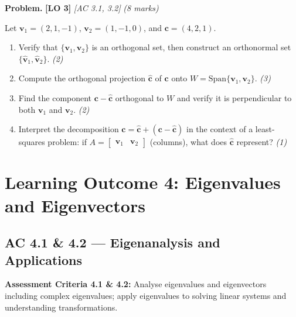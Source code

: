 \documentclass[12pt,a4paper]{article}
\newcommand{\lo}[1]{\textcolor{locolor}{\textbf{[LO #1]}}}
\newcommand{\ac}[1]{\textcolor{locolor}{\textit{[AC #1]}}}
\begin{document}
	\begin{tcolorbox}[practice]
		\textbf{Problem.} \lo{3} \ac{3.1, 3.2} \hfill \textit{(8 marks)}
		
		Let $\mathbf{v}_1=(2,1,-1)$, $\mathbf{v}_2=(1,-1,0)$, and $\mathbf{c}=(4,2,1)$.
		
		\begin{enumerate}[label=(\alph*)]
			\item Verify that $\{\mathbf{v}_1,\mathbf{v}_2\}$ is an orthogonal set, then construct an orthonormal set $\{\hat{\mathbf{v}}_1,\hat{\mathbf{v}}_2\}$. \hfill\textit{(2)}
			\item Compute the orthogonal projection $\hat{\mathbf{c}}$ of $\mathbf{c}$ onto $W=\text{Span}\{\mathbf{v}_1,\mathbf{v}_2\}$. \hfill\textit{(3)}
			\item Find the component $\mathbf{c}-\hat{\mathbf{c}}$ orthogonal to $W$ and verify it is perpendicular to both $\mathbf{v}_1$ and $\mathbf{v}_2$. \hfill\textit{(2)}
			\item Interpret the decomposition $\mathbf{c}=\hat{\mathbf{c}}+(\mathbf{c}-\hat{\mathbf{c}})$ in the context of a least-squares problem: if $A=\begin{bmatrix}\mathbf{v}_1 & \mathbf{v}_2\end{bmatrix}$ (columns), what does $\hat{\mathbf{c}}$ represent? \hfill\textit{(1)}
		\end{enumerate}
	\end{tcolorbox}
	
	\begin{tcolorbox}[answer]
	\end{tcolorbox}
	
	\newpage
	
	\section{Learning Outcome 4: Eigenvalues and Eigenvectors}
	
	\subsection{AC 4.1 \& 4.2 — Eigenanalysis and Applications}
	
	\begin{tcolorbox}[subtopic]
		\textbf{Assessment Criteria 4.1 \& 4.2:} Analyse eigenvalues and eigenvectors including
		complex eigenvalues; apply eigenvalues to solving linear systems and understanding transformations.
	\end{tcolorbox}
	
\end{document}

